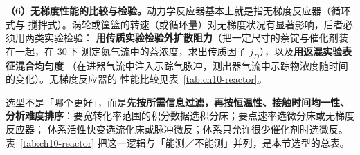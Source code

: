 \textbf{（6）无梯度性能的比较与检验。}动力学反应器基本上就是指无梯度反应器（循环式与
搅拌式）。涡轮或筐篮的转速（或循环量）对无梯度状况有显著影响，后者必须用两类实验检验：
\textbf{用传质实验检验外扩散阻力}（把一定尺寸的萘锭与催化剂装在一起，在 $30$\,\degC 下
测定氮气流中的萘浓度，求出传质因子 $j_D$），以及\textbf{用返混实验表征混合均匀度}
（在进器气流中注入示踪气脉冲，测出器气流中示踪物浓度随时间的变化）。无梯度反应器的
性能比较见表~\ref{tab:ch10-reactor}。

选型不是「哪个更好」，而是\textbf{先按所需信息过滤，再按恒温性、接触时间均一性、
分析难度排序}：要宽转化率范围的积分数据选积分床；要点速率选微分床或无梯度反应器；
体系活性快变选流化床或脉冲微反；体系只允许很少催化剂时选微反。表~\ref{tab:ch10-reactor}
把这一逻辑与「能测／不能测」并列，是本节选型的总表。


